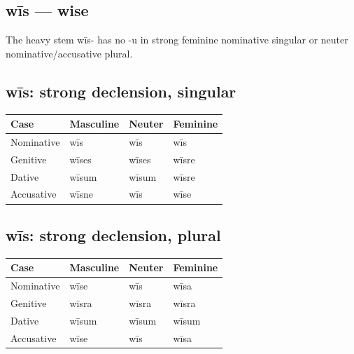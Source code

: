 \subsection*{wīs — wise}

The heavy stem wīs- has no -u in strong feminine nominative singular or neuter nominative/\allowbreak{}accusative plural.

\subsection*{wīs: strong declension, singular}

\par\begingroup
\fontsize{10.5}{13.2}\selectfont
\setlength{\LTleft}{0pt}\setlength{\LTright}{\fill}
\noindent
\begin{tabular}{@{}>{\raggedright\arraybackslash}p{28.89mm}>{\raggedright\arraybackslash}p{28.89mm}>{\raggedright\arraybackslash}p{28.89mm}>{\raggedright\arraybackslash}p{28.89mm}@{}}
\toprule
\textbf{Case} & \textbf{Masculine} & \textbf{Neuter} & \textbf{Feminine} \\
\midrule
Nominative & wīs & wīs & wīs \\
Genitive & wīses & wīses & wīsre \\
Dative & wīsum & wīsum & wīsre \\
Accusative & wīsne & wīs & wīse \\
\bottomrule
\end{tabular}
\par\endgroup

\subsection*{wīs: strong declension, plural}

\par\begingroup
\fontsize{10.5}{13.2}\selectfont
\setlength{\LTleft}{0pt}\setlength{\LTright}{\fill}
\noindent
\begin{tabular}{@{}>{\raggedright\arraybackslash}p{28.89mm}>{\raggedright\arraybackslash}p{28.89mm}>{\raggedright\arraybackslash}p{28.89mm}>{\raggedright\arraybackslash}p{28.89mm}@{}}
\toprule
\textbf{Case} & \textbf{Masculine} & \textbf{Neuter} & \textbf{Feminine} \\
\midrule
Nominative & wīse & wīs & wīsa \\
Genitive & wīsra & wīsra & wīsra \\
Dative & wīsum & wīsum & wīsum \\
Accusative & wīse & wīs & wīsa \\
\bottomrule
\end{tabular}
\par\endgroup

